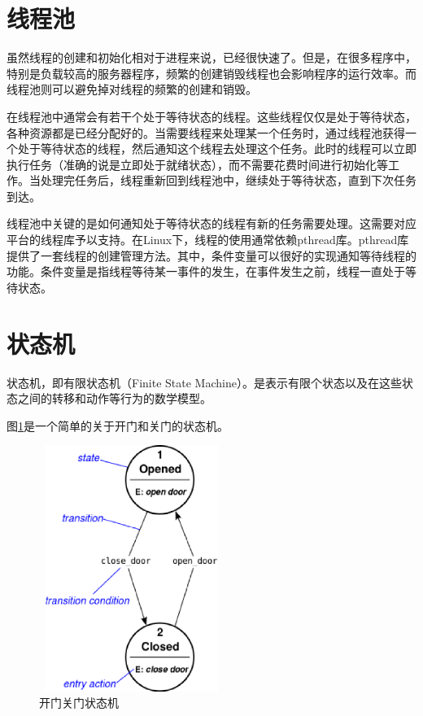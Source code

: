 \documentclass[twoside, xetex]{report}
\begin{document}
\section{线程池}
	虽然线程的创建和初始化相对于进程来说，已经很快速了。但是，在很多程序中，特别是负载较高的服务器程序，频繁的创建销毁线程也会影响程序的运行效率。而线程池则可以避免掉对线程的频繁的创建和销毁。
	
	在线程池中通常会有若干个处于等待状态的线程。这些线程仅仅是处于等待状态，各种资源都是已经分配好的。当需要线程来处理某一个任务时，通过线程池获得一个处于等待状态的线程，然后通知这个线程去处理这个任务。此时的线程可以立即执行任务（准确的说是立即处于就绪状态），而不需要花费时间进行初始化等工作。当处理完任务后，线程重新回到线程池中，继续处于等待状态，直到下次任务到达。
	
	线程池中关键的是如何通知处于等待状态的线程有新的任务需要处理。这需要对应平台的线程库予以支持。在Linux下，线程的使用通常依赖pthread库。pthread库提供了一套线程的创建管理方法。其中，条件变量可以很好的实现通知等待线程的功能。条件变量是指线程等待某一事件的发生，在事件发生之前，线程一直处于等待状态。

\section{状态机}
	状态机，即有限状态机（Finite State Machine）。是表示有限个状态以及在这些状态之间的转移和动作等行为的数学模型。
	
	图\ref{fsm}是一个简单的关于开门和关门的状态机。
	
	\begin{figure}[htbp]
	\centering
	\includegraphics[height=8cm, width=6cm]{pics/fsm.eps}
	\caption{开门关门状态机}
	\label{fsm}
	\end{figure}
	
\end{document}
